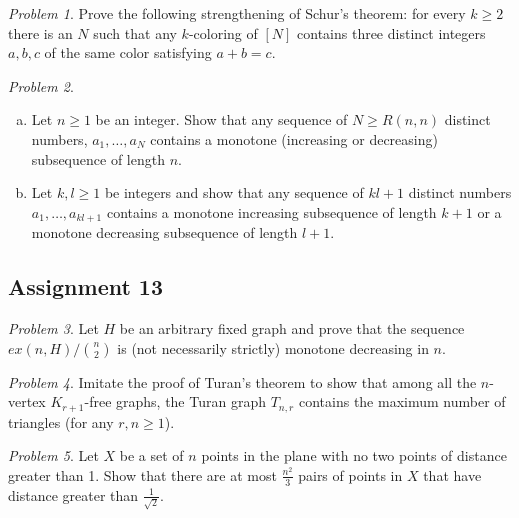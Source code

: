 \documentclass[11pt, fleqn, a4paper, landscape]{article}
\theoremstyle{plain} %
\theoremstyle{remark} %
\newtheorem{problem}{Problem}
\theoremstyle{definition} %
\begin{document}
\begin{multicols}{3}
\begin{problem}
Prove the following strengthening of Schur's theorem: for every $k\ge 2$ there is an $N$ such that any $k$-coloring of $[N]$ contains three distinct integers $a, b, c$ of the same color satisfying $a + b = c.$
\end{problem}

\begin{problem}
\begin{enumerate}[(a)]
\item Let $n\ge 1$ be an integer. Show that any sequence of $N\ge R(n, n)$  distinct numbers, $a_1,\dots, a_N$ contains a monotone (increasing or decreasing) subsequence of length $n$.
\item Let $k, l \ge1$ be integers and show that any sequence of $kl+1$ distinct numbers $a_1,\dots, a_{kl+1}$ contains a monotone increasing subsequence of length $k + 1$ or a monotone decreasing
subsequence of length $l + 1$.
\end{enumerate}
\end{problem}

\subsection{Assignment 13}

\begin{problem}
Let $H$ be an arbitrary fixed graph and prove that the sequence $ex(n,H)/\binom{n}{2}$ is (not necessarily strictly) monotone decreasing in $n$.
\end{problem}

\begin{problem}
Imitate the proof of Turan's theorem to show that among all the $n$-vertex $K_{r+1}$-free graphs, the Turan graph $T_{n,r}$ contains the maximum number of triangles (for any $r, n \ge 1$).
\end{problem}

\begin{problem}
Let $X$ be a set of $n$ points in the plane with no two points of distance greater than 1. Show that there are at most $\frac{n^2}{3}$ pairs of points in $X$ that have distance greater than $\frac{1}{\sqrt{2}}$.
\end{problem}


\end{multicols}
\end{document}
